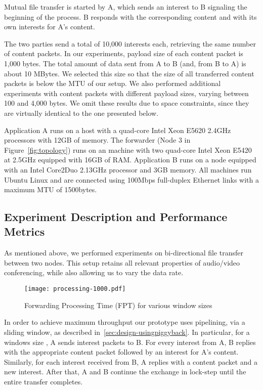 \documentclass[conference]{IEEEtran}
\begin{document}
Mutual file transfer is started by A, which sends an interest to B signaling the 
beginning of the process. B responds with the corresponding content and with its own 
interests for A's content.

The two parties send a total of 10,000 interests each, retrieving the same number of content packets. 
In our experiments, payload size of each content packet is 1,000 bytes. The total amount of data 
sent from A to B (and, from B to A) is about 10 MBytes.  We selected this size so that the 
size of all transferred content packets is below the MTU of our setup.  
We also performed additional experiments with content packets with different payload sizes, 
varying between 100 and 4,000 bytes. We omit these results due to space constraints, since they
are virtually identical to the one presented below.

Application A runs on a host with a quad-core Intel Xeon E5620 2.4GHz processors with 
12GB of memory. The forwarder (Node 3 in Figure~\ref{fig:topology}) runs on an machine 
with two quad-core Intel Xeon E5420 at 2.5GHz equipped with 16GB of RAM. 
Application B runs on a node equipped with an Intel Core2Duo 2.13GHz processor and 3GB 
memory. All machines run Ubuntu Linux and are connected using 100Mbps full-duplex 
Ethernet links with a maximum MTU of 1500bytes.


\subsection{Experiment Description and Performance Metrics}
\label{parameter}
As mentioned above, we performed experiments on bi-directional file transfer between two nodes. 
This setup retains all relevant properties of audio/video conferencing, while also
allowing us to vary the data rate. 

\begin{figure*}[htb]
\centering
\texttt{[image: processing-1000.pdf]}
\caption{Forwarding Processing Time (FPT) for various window sizes}
\label{fig:processing-1000}
\end{figure*}

In order to achieve maximum throughput our prototype uses pipelining, via a sliding 
window, as described in~\ref{sec:design-usingpiggyback}. In particular, for a windows 
size , A sends  interest packets to B. For every interest from A, B replies with 
the appropriate content packet followed by an interest for A's content. Similarly, for each interest 
received from B, A replies with a content packet and a new interest.  After that, A and B 
continue the exchange in lock-step until the entire transfer completes.
\end{document}

